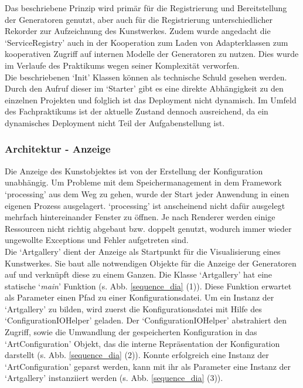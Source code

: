 \documentclass[../mciAusarbeitung.tex]{subfiles}
\begin{document}
Das beschriebene Prinzip wird primär für die Registrierung und Bereitstellung der Generatoren genutzt, aber auch für die Registrierung unterschiedlicher Rekorder zur Aufzeichnung des Kunstwerkes. Zudem wurde angedacht die `ServiceRegistry' auch in der Kooperation zum Laden von Adapterklassen zum kooperativen Zugriff auf internen Modelle der Generatoren zu nutzen. Dies wurde im Verlaufe des Praktikums wegen seiner Komplexität verworfen.\\

Die beschriebenen `Init' Klassen können als technische Schuld gesehen werden. Durch den Aufruf dieser im `Starter' gibt es eine direkte Abhängigkeit zu den einzelnen Projekten und folglich ist das Deployment nicht dynamisch. Im Umfeld des Fachpraktikums ist der aktuelle Zustand dennoch ausreichend, da ein dynamisches Deployment nicht Teil der Aufgabenstellung ist.

\subsubsection{Architektur - Anzeige}
	Die Anzeige des Kunstobjektes ist von der Erstellung der Konfiguration unabhängig. Um Probleme mit dem Speichermanagement in dem Framework `processing' aus dem Weg zu gehen, wurde der Start jeder Anwendung in einen eigenen Prozess ausgelagert. `processing' ist anscheinend nicht dafür ausgelegt mehrfach hintereinander Fenster zu öffnen. Je nach Renderer werden einige Ressourcen nicht richtig abgebaut bzw. doppelt genutzt, wodurch immer wieder ungewollte Exceptions und Fehler aufgetreten sind.\\
	Die `Artgallery' dient der Anzeige als Startpunkt für die Visualisierung eines Kunstwerkes. Sie baut alle notwendigen Objekte für die Anzeige der Generatoren auf und verknüpft diese zu einem Ganzen. Die Klasse `Artgallery' hat eine statische `\textit{main}' Funktion (s. Abb. \ref{sequence_dia} (1)). Diese Funktion erwartet als Parameter einen Pfad zu einer Konfigurationsdatei. Um ein Instanz der `Artgallery' zu bilden, wird zuerst die Konfigurationsdatei mit Hilfe des `ConfigurationIOHelper' geladen. Der `ConfigurationIOHelper' abstrahiert den Zugriff, sowie die Umwandlung der gespeicherten Konfiguration in das `ArtConfiguration' Objekt, das die interne Repräsentation der Konfiguration darstellt (s. Abb. \ref{sequence_dia} (2)). Konnte erfolgreich eine Instanz der `ArtConfiguration' geparst werden, kann mit ihr als Parameter eine Instanz der `Artgallery' instanziiert werden (s. Abb. \ref{sequence_dia} (3)).
	
\end{document}
